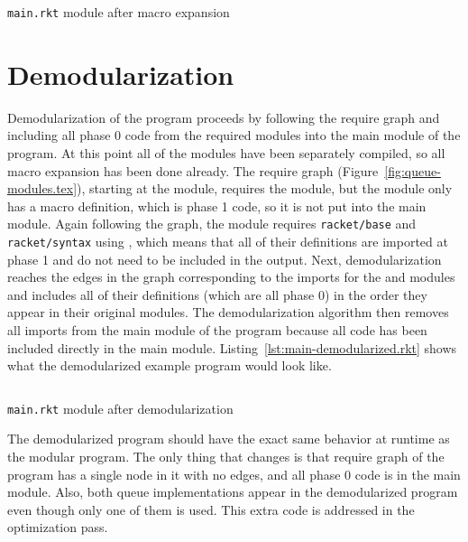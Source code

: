 \begin{listing}[tb]
  \inputminted{racket}{listings/main-expanded.rkt}
  \caption{\texttt{main.rkt} module after macro expansion}
  \label{lst:main-expanded.rkt}
\end{listing}


\section{Demodularization}

Demodularization of the program proceeds by following the require graph and including all phase 0 code from the required modules into the main module of the program. 
At this point all of the modules have been separately compiled, so all macro expansion has been done already.
The require graph (Figure~\ref{fig:queue-modules.tex}), starting at the  module, requires the  module, but the  module only has a macro definition, which is phase 1 code, so it is not put into the main module.
Again following the graph, the  module requires \texttt{racket/base} and \texttt{racket/syntax} using , which means that all of their definitions are imported at phase 1 and do not need to be included in the output. 
Next, demodularization reaches the edges in the graph corresponding to the imports for the  and  modules and includes all of their definitions (which are all phase 0) in the order they appear in their original modules.
The demodularization algorithm then removes all imports from the main module of the program because all code has been included directly in the main module.
Listing~\ref{lst:main-demodularized.rkt} shows what the demodularized example program would look like.

\begin{listing}[tb]
  \inputminted{racket}{listings/main-demodularized.rkt}
  \caption{\texttt{main.rkt} module after demodularization}
  \label{lst:main-demodularized.rkt}
\end{listing}

The demodularized program should have the exact same behavior at runtime as the modular program.
The only thing that changes is that require graph of the program has a single node in it with no edges, and all phase 0 code is in the main module. 
Also, both queue implementations appear in the demodularized program even though only one of them is used.
This extra code is addressed in the optimization pass.

